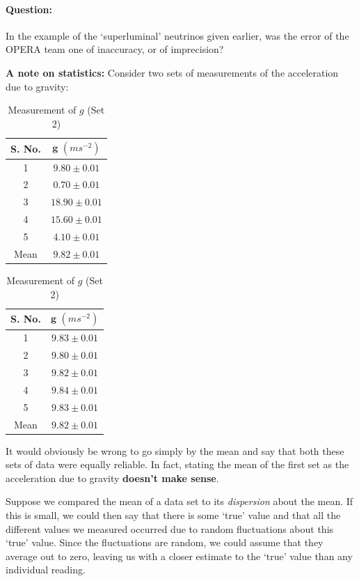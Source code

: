 \begin{question}
\paragraph{Question:} In the example of the `superluminal' neutrinos given earlier, was the error of the OPERA team one of inaccuracy, or of imprecision? 
\end{question}

\textbf{A note on statistics:} Consider two sets of measurements of the acceleration due to gravity:

\begin{table}[!htb]
\parbox{.45\linewidth}{
\centering
\begin{tabular}{cc}
\hline
\textbf{S. No.}&$\bm{g}\,\, (ms^{-2})$\\
\hline
1&$9.80\pm0.01$\\
2&$0.70\pm0.01$\\
3&$18.90\pm0.01$\\
4&$15.60\pm0.01$\\
5&$4.10\pm0.01$\\
\hline
Mean&$9.82\pm0.01$\\
\hline
\end{tabular}
\caption{Measurement of $g$ (Set 1)}
}
\hfill
\parbox{.45\linewidth}{
\centering
\begin{tabular}{cc}
\hline
\textbf{S. No.}&$\bm{g}\,\, (ms^{-2})$\\
\hline
1&$9.83\pm0.01$\\
2&$9.80\pm0.01$\\
3&$9.82\pm0.01$\\
4&$9.84\pm0.01$\\
5&$9.83\pm0.01$\\
\hline
Mean&$9.82\pm0.01$\\
\hline
\end{tabular}
\caption{Measurement of $g$ (Set 2)}
}
\end{table}

It would obviously be wrong to go simply by the mean and say that both these sets of data were equally reliable. In fact, stating the mean of the first set as the acceleration due to gravity \textbf{doesn't make sense}. 

Suppose we compared the mean of a data set to its \textit{dispersion} about the mean. If this is small, we could then say that there is some `true' value and that all the different values we measured occurred due to random fluctuations about this `true' value. Since the fluctuations are random, we could assume that they average out to zero, leaving us with a closer estimate to the `true' value than any individual reading.

